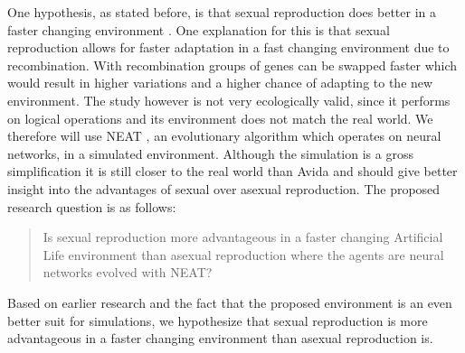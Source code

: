 One hypothesis, as stated before, is that sexual reproduction does better in a faster changing environment \cite{misevicchanging}. 
One explanation for this is that sexual reproduction allows for faster adaptation in a fast changing environment due to recombination. 
With recombination groups of genes can be swapped faster which would result in higher variations and a higher chance of adapting to the new environment.
The study however is not very ecologically valid, since it performs on logical operations and its environment does not match the real world. 
We therefore will use NEAT \cite{stanleyneat}, an evolutionary algorithm which operates on neural networks, in a simulated environment. 
Although the simulation is a gross simplification it is still closer to the real world than Avida and should give better insight into the advantages of sexual over asexual reproduction.
The proposed research question is as follows:

\begin{quote}
Is sexual reproduction more advantageous in a faster changing Artificial Life environment than asexual reproduction where the agents are neural networks evolved with NEAT? 
\end{quote}

\noindent Based on earlier research and the fact that the proposed environment is an even better suit for simulations, we hypothesize that sexual reproduction is more advantageous in a faster changing environment than asexual reproduction is.

